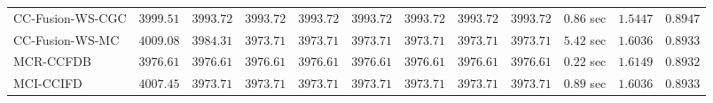 \begin{table}[H]
\begin{tabular}{lrrrrrrrrrrr}
    CC-Fusion-WS-CGC & $      3999.51$ & $      3993.72$ & $      3993.72$ & $      3993.72$ & $      3993.72$ & $      3993.72$ & $      3993.72$ & $      3993.72$ & $         0.86$ sec    & $       1.5447$  & $       0.8947$ \\ 
     CC-Fusion-WS-MC & $      4009.08$ & $      3984.31$ & $      3973.71$ & $      3973.71$ & $      3973.71$ & $      3973.71$ & $      3973.71$ & $      3973.71$ & $         5.42$ sec    & $       1.6036$  & $       0.8933$ \\ 
\cmidrule{1-1} 
           MCR-CCFDB & $      3976.61$ & $      3976.61$ & $      3976.61$ & $      3976.61$ & $      3976.61$ & $      3976.61$ & $      3976.61$ & $      3976.61$ & $         0.22$ sec    & $       1.6149$  & $       0.8932$ \\ 
\cmidrule{1-1} 
           MCI-CCIFD & $      4007.45$ & $      3973.71$ & $      3973.71$ & $      3973.71$ & $      3973.71$ & $      3973.71$ & $      3973.71$ & $      3973.71$ & $         0.89$ sec    & $       1.6036$  & $       0.8933$ \\ 
\bottomrule
\end{tabular}
\end{table}

